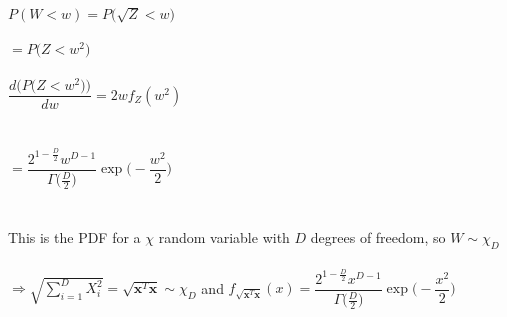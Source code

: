 \documentclass[submit]{harvardml}
\begin{document}
$P(W<w)=P\big(\sqrt{Z}<w\big)$\\\\
$=P\big(Z<w^2\big)$\\\\
$\dfrac{d\Big(P\big(Z<w^2\big)\Big)}{dw}=2wf_Z(w^2)$\\\\\\
$=\dfrac{2^{1-\frac{D}{2}}w^{D-1}}{\Gamma\big(\frac{D}{2}\big)}\exp\bigg(-\dfrac{w^2}{2}\bigg)$\\\\\\
This is the PDF for a $\chi$ random variable with $D$ degrees of freedom, so $W\sim\chi_D$\\\\
$\Rightarrow\sqrt{\displaystyle\sum_{i=1}^{D}X_i^2}=\sqrt{\mathbf{x}^T\mathbf{x}}\sim\chi_D$ and $f_{\sqrt{\mathbf{x}^T\mathbf{x}}}(x)=\dfrac{2^{1-\frac{D}{2}}x^{D-1}}{\Gamma\big(\frac{D}{2}\big)}\exp\bigg(-\dfrac{x^2}{2}\bigg)$

\newpage

\newpage
\end{document}
